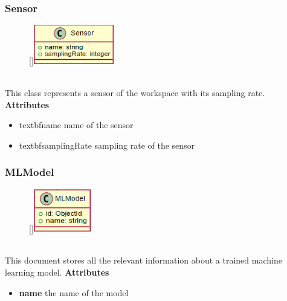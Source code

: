 \newpage
\subsubsection{Sensor}
\label{mm-Sensor}
\begin{figure}
    \raisebox{0pt}[\dimexpr{}\baselineskip\relax]{\includegraphics[width=3.5cm]{classes/model-management/3.png}}
\end{figure} 
~\\
This class represents a sensor of the workspace with its sampling rate.
\newline
\newline
\newline
\textbf{Attributes}
\begin{itemize}
    \item textbf{name} name of the sensor
    \item textbf{samplingRate} sampling rate of the sensor
\end{itemize}

\subsubsection{MLModel}
\label{MLModel}
\begin{figure}
    \raisebox{0pt}[\dimexpr{}\baselineskip\relax]{\includegraphics[width=2.5cm]{classes/model-management/4.png}}
\end{figure} 
~\\
This document stores all the relevant information about a trained machine learning model.
\newline
\newline
\newline
\newline
\textbf{Attributes}
\begin{itemize}
    \item \textbf{name} the name of the model
\end{itemize}

